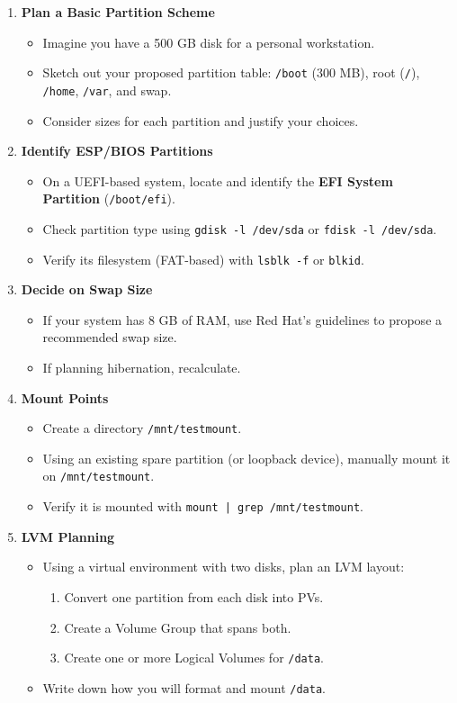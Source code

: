 \documentclass[a4paper]{report}
\begin{document}
\begin{enumerate}
    \item \textbf{Plan a Basic Partition Scheme}
    \begin{itemize}
        \item Imagine you have a 500 GB disk for a personal workstation.
        \item Sketch out your proposed partition table: \texttt{/boot} (300 MB), root (\texttt{/}), \texttt{/home}, \texttt{/var}, and swap.
        \item Consider sizes for each partition and justify your choices.
    \end{itemize}

    \item \textbf{Identify ESP/BIOS Partitions}
    \begin{itemize}
        \item On a UEFI-based system, locate and identify the \textbf{EFI System Partition} (\texttt{/boot/efi}).
        \item Check partition type using \texttt{gdisk -l /dev/sda} or \texttt{fdisk -l /dev/sda}.
        \item Verify its filesystem (FAT-based) with \texttt{lsblk -f} or \texttt{blkid}.
    \end{itemize}

    \item \textbf{Decide on Swap Size}
    \begin{itemize}
        \item If your system has 8 GB of RAM, use Red Hat’s guidelines to propose a recommended swap size.
        \item If planning hibernation, recalculate.
    \end{itemize}

    \item \textbf{Mount Points}
    \begin{itemize}
        \item Create a directory \texttt{/mnt/testmount}.
        \item Using an existing spare partition (or loopback device), manually mount it on \texttt{/mnt/testmount}.
        \item Verify it is mounted with \texttt{mount | grep /mnt/testmount}.
    \end{itemize}

    \item \textbf{LVM Planning}
    \begin{itemize}
        \item Using a virtual environment with two disks, plan an LVM layout:
        \begin{enumerate}
            \item Convert one partition from each disk into PVs.
            \item Create a Volume Group that spans both.
            \item Create one or more Logical Volumes for \texttt{/data}.
        \end{enumerate}
        \item Write down how you will format and mount \texttt{/data}.
    \end{itemize}


\end{enumerate}
\end{document}
